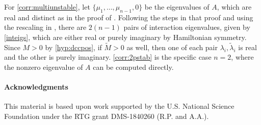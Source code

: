 \documentclass[12pt]{elsarticle}
\begin{document}
For \cref{corr:multiunstable}, let $\{ \mu_1,\dots,\mu_{n-1}, 0\}$ be the eigenvalues of $A$, which are real and distinct as in the proof of \cite[Theorem 5]{Parker2020}. Following the steps in that proof and using the rescaling in \cite[Theorem 3]{Sandstede1998}, there are $2(n-1)$ pairs of interaction eigenvalues, given by \cref{inteigs}, which are either real or purely imaginary by Hamiltonian symmetry. Since $M > 0$ by \cref{hyp:dccpos}, if $\tilde{M} > 0$ as well, then one of each pair $\lambda_i, \tilde{\lambda}_i$ is real and the other is purely imaginary. \cref{corr:2pstab} is the specific case $n = 2$, where the nonzero eigenvalue of $A$ can be computed directly.

\paragraph{Acknowledgments}

This material is based upon work supported by the U.S. National Science Foundation under the RTG grant DMS-1840260 (R.P. and A.A.).


\end{document}
